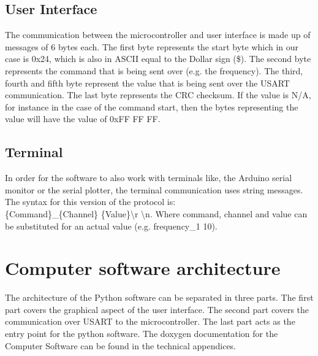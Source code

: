\documentclass[conference]{IEEEtran}
\begin{document}
\subsection{User Interface}\label{UI_communication}
The communication between the microcontroller and user interface is made up of messages of 6 bytes each. The first byte represents the start byte which in our case is 0x24, which is also in ASCII equal to the Dollar sign (\$). The second byte represents the command that is being sent over (e.g. the frequency). The third, fourth and fifth byte represent the value that is being sent over the USART communication. The last byte represents the CRC checksum. If the value is N/A, for instance in the case of the command start, then the bytes representing the value will have the value of 0xFF FF FF.

\subsection{Terminal}
In order for the software to also work with terminals like, the Arduino serial monitor or the serial plotter, the terminal communication uses string messages. The syntax for this version of the protocol is:
\\ \{Command\}\_\{Channel\} \{Value\}\textbackslash r \textbackslash n. Where command, channel and value can be substituted for an actual value (e.g. frequency\_1 10).



\section{Computer software architecture}

The architecture of the Python software can be separated in three parts. The first part covers the graphical aspect of the user interface. The second part covers the communication over USART to the microcontroller. The last part acts as the entry point for the python software. The doxygen documentation for the Computer Software can be found in the technical appendices.
\end{document}
